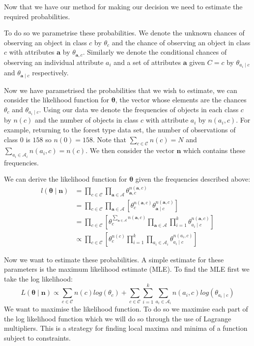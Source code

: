 Now that we have our method for making our decision we need to estimate the required probabilities.

To do so we parametrise these probabilities.
We denote the unknown chances of observing an object in class $c$ by $\theta_c$ and the chance of observing an object in class $c$ with attributes $\mathbf{a}$ by $\theta_{\mathbf{a}, c}$.
Similarly we denote the conditional chances of observing an individual attribute $a_i$ and a set of attributes $\mathbf{a}$ given $C=c$ by $\theta_{a_i \mid c}$ and $\theta_{\mathbf{a} \mid c}$ respectively.

Now we have parametrised the probabilities that we wish to estimate, we can consider the likelihood function for $\mathbf{\theta}$, the vector whose elements are the chances $\theta_{c}$ and $\theta_{a_i \mid c}$.
Using our data we denote the frequencies of objects in each class $c$ by $n(c)$ and the number of objects in class $c$ with attribute $a_i$ by $n(a_i, c)$.
For example, returning to the forest type data set, the number of observations of class $0$ is $158$ so $n(0) = 158$.
Note that $\sum_{c \in \mathcal{C}}n(c) = N$ and $\sum_{a_i \in \mathcal{A}_i}n(a_i, c) = n(c)$.
We then consider the vector $\mathbf{n}$ which contains these frequencies.

We can derive the likelihood function for $\mathbf{\theta}$ given the frequencies described above:
\begin{align} \label{likelihood}
	l(\mathbf{\theta} \mid \mathbf{n}) & =  \prod_{c \in \mathcal{C}} \prod_{\mathbf{a} \in \mathbf{\mathcal{A}}} \theta_{\mathbf{a}, c}^{n(\mathbf{a}, c)} \\
	& = \prod_{c \in \mathcal{C}} \prod_{\mathbf{a} \in \mathbf{\mathcal{A}}} \left[ \theta_{c}^{n(\mathbf{a}, c)} \theta_{\mathbf{a} \mid c}^{n(\mathbf{a}, c)} \right] \\
	& = \prod_{c \in \mathcal{C}} \left[ \theta_{c}^{\sum_{\mathbf{a} \in \mathbf{\mathcal{A}}} n(\mathbf{a}, c)} \prod_{\mathbf{a} \in \mathbf{\mathcal{A}}} \prod_{i=1}^k \theta_{a_i \mid c}^{n(\mathbf{a}, c)} \right] \\
	& \propto \prod_{c \in \mathcal{C}} \left[ \theta_c^{n(c)} \prod_{i=1}^k \prod_{a_i \in \mathcal{A}_i} \theta_{a_i \mid c}^{n(a_i, c)} \right]
\end{align}

Now we want to estimate these probabilities.
A simple estimate for these parameters is the maximum likelihood estimate (MLE).
To find the MLE first we take the log likelihood:
\begin{equation}
	L(\mathbf{\theta} \mid \mathbf{n}) \propto \sum_{c \in \mathcal{C}}  n(c)log(\theta_c) + \sum_{c \in \mathcal{C}} \sum_{i=1}^k \sum_{a_i \in \mathcal{A}_i} n(a_i, c) log(\theta_{a_i \mid c}) 
\end{equation}
We want to maximise the likelihood function.
To do so we maximise each part of the log likelihood function which we will do so through the use of Lagrange multipliers.
This is a strategy for finding local maxima and minima of a function subject to constraints.

